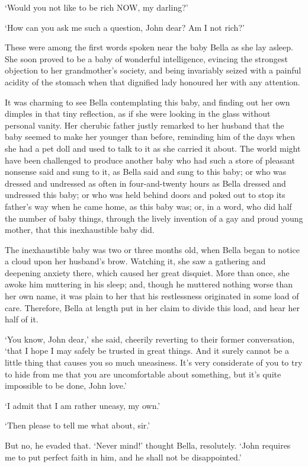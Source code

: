 ‘Would you not like to be rich NOW, my darling?’

‘How can you ask me such a question, John dear? Am I not rich?’

These were among the first words spoken near the baby Bella as she lay
asleep. She soon proved to be a baby of wonderful intelligence,
evincing the strongest objection to her grandmother’s society, and
being invariably seized with a painful acidity of the stomach when that
dignified lady honoured her with any attention.

It was charming to see Bella contemplating this baby, and finding out
her own dimples in that tiny reflection, as if she were looking in the
glass without personal vanity. Her cherubic father justly remarked
to her husband that the baby seemed to make her younger than before,
reminding him of the days when she had a pet doll and used to talk to it
as she carried it about. The world might have been challenged to produce
another baby who had such a store of pleasant nonsense said and sung
to it, as Bella said and sung to this baby; or who was dressed and
undressed as often in four-and-twenty hours as Bella dressed and
undressed this baby; or who was held behind doors and poked out to stop
its father’s way when he came home, as this baby was; or, in a word, who
did half the number of baby things, through the lively invention of a
gay and proud young mother, that this inexhaustible baby did.

The inexhaustible baby was two or three months old, when Bella began to
notice a cloud upon her husband’s brow. Watching it, she saw a gathering
and deepening anxiety there, which caused her great disquiet. More than
once, she awoke him muttering in his sleep; and, though he muttered
nothing worse than her own name, it was plain to her that his
restlessness originated in some load of care. Therefore, Bella at length
put in her claim to divide this load, and hear her half of it.

‘You know, John dear,’ she said, cheerily reverting to their former
conversation, ‘that I hope I may safely be trusted in great things. And
it surely cannot be a little thing that causes you so much uneasiness.
It’s very considerate of you to try to hide from me that you are
uncomfortable about something, but it’s quite impossible to be done,
John love.’

‘I admit that I am rather uneasy, my own.’

‘Then please to tell me what about, sir.’

But no, he evaded that. ‘Never mind!’ thought Bella, resolutely.
‘John requires me to put perfect faith in him, and he shall not be
disappointed.’


